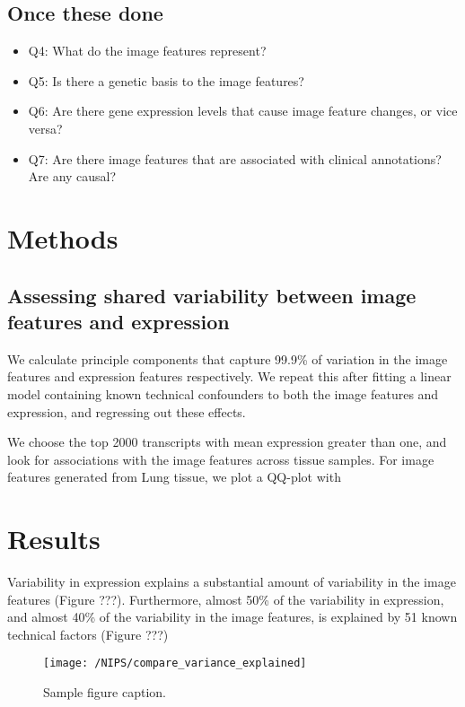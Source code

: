 \documentclass{article}
\begin{document}
\subsection*{Once these done}
\begin{itemize}
\item Q4: What do the image features represent?
\item Q5: Is there a genetic basis to the image features?
\item Q6: Are there gene expression levels that cause image feature changes, or vice versa?
\item Q7: Are there image features that are associated with clinical annotations? Are any causal?

\end{itemize}

\section*{Methods}

\subsection*{Assessing shared variability between image features and expression}
We calculate principle components that capture 99.9\% of variation in the image features and expression features respectively. We repeat this after fitting a linear model containing known technical confounders to both the image features and expression, and regressing out these effects.

We choose the top 2000 transcripts with mean expression greater than one, and look for associations with the image features across tissue samples. For image features generated from Lung tissue, we plot a QQ-plot with 

\section*{Results}

Variability in expression explains a substantial amount of variability in the image features (Figure ???). Furthermore, almost 50\% of the variability in expression, and almost 40\% of the variability in the image features, is explained by 51 known technical factors (Figure ???)

\begin{figure}[H]
  \centering
    \texttt{[image: /NIPS/compare\_variance\_explained]} 
  \caption{Sample figure caption.}
\end{figure}
\end{document}
